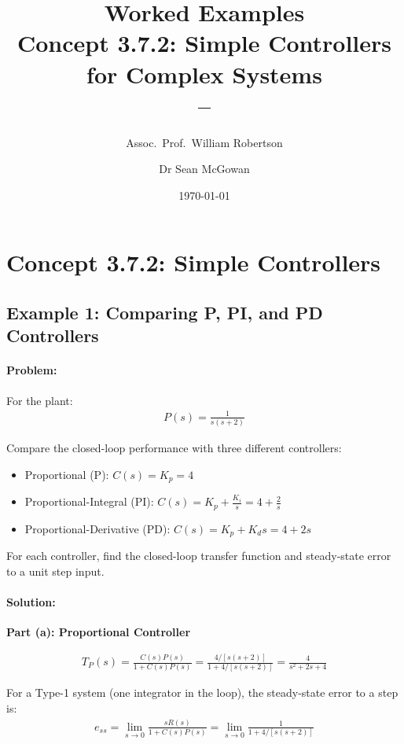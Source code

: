 \documentclass[11pt,a4paper]{article}
\title{\textbf{Worked Examples}\\[0.5em]
\large Concept 3.7.2: Simple Controllers for Complex Systems\\[0.3em]
\normalsize \coursesubtitle{} -- \coursetitle}
\author{Assoc.\ Prof.\ William Robertson \and Dr Sean McGowan}
\date{\today}
\begin{document}
\maketitle
\tableofcontents
\newpage

\section{Concept 3.7.2: Simple Controllers}

\subsection{Example 1: Comparing P, PI, and PD Controllers}

\paragraph{Problem:} For the plant:
\begin{align}
  P(s) = \frac{1}{s(s+2)}
\end{align}

Compare the closed-loop performance with three different controllers:
\begin{itemize}
  \item[(a)] Proportional (P): $C(s) = K_p = 4$
  \item[(b)] Proportional-Integral (PI): $C(s) = K_p + \frac{K_i}{s} = 4 + \frac{2}{s}$
  \item[(c)] Proportional-Derivative (PD): $C(s) = K_p + K_d s = 4 + 2s$
\end{itemize}

For each controller, find the closed-loop transfer function and steady-state error to a unit step input.

\paragraph{Solution:}

\textbf{Part (a): Proportional Controller}

\begin{align}
  T_P(s) = \frac{C(s)P(s)}{1 + C(s)P(s)} = \frac{4/[s(s+2)]}{1 + 4/[s(s+2)]} = \frac{4}{s^2 + 2s + 4}
\end{align}

For a Type-1 system (one integrator in the loop), the steady-state error to a step is:
\begin{align}
  e_{ss} = \lim_{s \to 0} \frac{sR(s)}{1 + C(s)P(s)} = \lim_{s \to 0} \frac{1}{1 + 4/[s(s+2)]}
\end{align}
\end{document}
